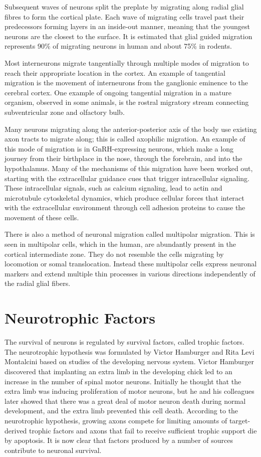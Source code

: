 Subsequent waves of neurons split the preplate by migrating along radial glial fibres to form the cortical plate. Each wave of migrating cells travel past their predecessors forming layers in an inside-out manner, meaning that the youngest neurons are the closest to the surface. It is estimated that glial guided migration represents 90\% of migrating neurons in human and about 75\% in rodents.

Most interneurons migrate tangentially through multiple modes of migration to reach their appropriate location in the cortex. An example of tangential migration is the movement of interneurons from the ganglionic eminence to the cerebral cortex. One example of ongoing tangential migration in a mature organism, observed in some animals, is the rostral migratory stream connecting subventricular zone and olfactory bulb.

Many neurons migrating along the anterior-posterior axis of the body use existing axon tracts to migrate along; this is called axophilic migration. An example of this mode of migration is in GnRH-expressing neurons, which make a long journey from their birthplace in the nose, through the forebrain, and into the hypothalamus. Many of the mechanisms of this migration have been worked out, starting with the extracellular guidance cues that trigger intracellular signaling. These intracellular signals, such as calcium signaling, lead to actin and microtubule cytoskeletal dynamics, which produce cellular forces that interact with the extracellular environment through cell adhesion proteins to cause the movement of these cells.

There is also a method of neuronal migration called multipolar migration. This is seen in multipolar cells, which in the human, are abundantly present in the cortical intermediate zone. They do not resemble the cells migrating by locomotion or somal translocation. Instead these multipolar cells express neuronal markers and extend multiple thin processes in various directions independently of the radial glial fibers.

\hypertarget{neurotrophic-factors}{%
\section{Neurotrophic Factors}\label{neurotrophic-factors}}

The survival of neurons is regulated by survival factors, called trophic factors. The neurotrophic hypothesis was formulated by Victor Hamburger and Rita Levi Montalcini based on studies of the developing nervous system. Victor Hamburger discovered that implanting an extra limb in the developing chick led to an increase in the number of spinal motor neurons. Initially he thought that the extra limb was inducing proliferation of motor neurons, but he and his colleagues later showed that there was a great deal of motor neuron death during normal development, and the extra limb prevented this cell death. According to the neurotrophic hypothesis, growing axons compete for limiting amounts of target-derived trophic factors and axons that fail to receive sufficient trophic support die by apoptosis. It is now clear that factors produced by a number of sources contribute to neuronal survival.

